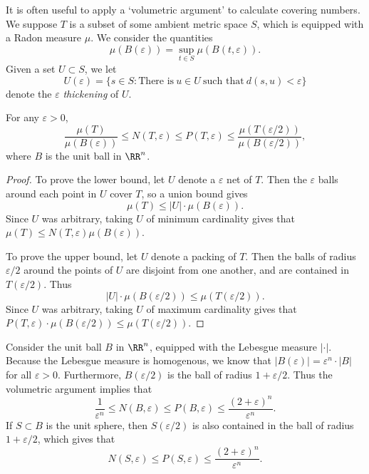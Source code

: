 It is often useful to apply a `volumetric argument' to calculate covering numbers. We suppose $T$ is a subset of some ambient metric space $S$, which is equipped with a Radon measure $\mu$. We consider the quantities
%
\[ \mu(B(\varepsilon)) = \sup_{t \in S} \mu(B(t,\varepsilon)). \]
%
Given a set $U \subset S$, we let
%
\[ U(\varepsilon) = \{ s \in S: \text{There is}\ u \in U\ \text{such that}\ d(s,u) < \varepsilon \} \]
%
denote the $\varepsilon$ \emph{thickening} of $U$.

\begin{lemma}
	For any $\varepsilon > 0$,
    \[ \frac{\mu(T)}{\mu(B(\varepsilon))} \leq N(T,\varepsilon) \leq P(T,\varepsilon) \leq \frac{\mu(T(\varepsilon/2))}{\mu(B(\varepsilon/2))}, \]
    where $B$ is the unit ball in $\RR^n$.
\end{lemma}
\begin{proof}
	To prove the lower bound, let $U$ denote a $\varepsilon$ net of $T$. Then the $\varepsilon$ balls around each point in $U$ cover $T$, so a union bound gives
    \[ \mu(T) \leq |U| \cdot \mu(B(\varepsilon)). \]
    Since $U$ was arbitrary, taking $U$ of minimum cardinality gives that $\mu(T) \leq N(T,\varepsilon) \mu(B(\varepsilon))$.

    To prove the upper bound, let $U$ denote a packing of $T$. Then the balls of radius $\varepsilon/2$ around the points of $U$ are disjoint from one another, and are contained in $T(\varepsilon/2)$. Thus
    \[ |U| \cdot \mu(B(\varepsilon/2)) \leq \mu(T(\varepsilon/2)). \]
    Since $U$ was arbitrary, taking $U$ of maximum cardinality gives that $P(T,\varepsilon) \cdot \mu(B(\varepsilon/2)) \leq \mu(T(\varepsilon/2))$.
\end{proof}

\begin{example}
	Consider the unit ball $B$ in $\RR^n$, equipped with the Lebesgue measure $| \cdot |$. Because the Lebesgue measure is homogenous, we know that $|B(\varepsilon)| = \varepsilon^n \cdot |B|$ for all $\varepsilon > 0$. Furthermore, $B(\varepsilon/2)$ is the ball of radius $1 + \varepsilon/2$. Thus the volumetric argument implies that
	\[ \frac{1}{\varepsilon^n} \leq N(B,\varepsilon) \leq P(B,\varepsilon) \leq \frac{(2 + \varepsilon)^n}{\varepsilon^n}. \]
	If $S \subset B$ is the unit sphere, then $S(\varepsilon/2)$ is also contained in the ball of radius $1 + \varepsilon/2$, which gives that
	\[ N(S,\varepsilon) \leq P(S,\varepsilon) \leq \frac{(2 + \varepsilon)^n}{\varepsilon^n}. \]
\end{example}

